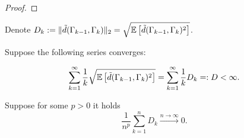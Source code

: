 \begin{lemma}
\begin{proof}
\end{proof}
\end{lemma}

Denote $D_k := \|\tilde{d}(\Gamma_{k-1}, \Gamma_k) \|_2 = \sqrt{\mathbb{E} \left[ \tilde{d}(\Gamma_{k-1}, \Gamma_k)^2 \right]}$.
\begin{assumption}
\label{a:adaptation-strong}
 Suppose the following series converges:

\[
\sum_{k=1}^{\infty} \frac{1}{k} \sqrt{\mathbb{E} \left[ \tilde{d}(\Gamma_{k-1}, \Gamma_k)^2 \right]} = \sum_{k=1}^{\infty} \frac{1}{k} D_k =: D < \infty.
\]

\end{assumption}
\begin{assumption}
\label{a:adaptation-weak}
Suppose for some $p > 0$ it holds
\[
\frac{1}{n^p} \sum_{k=1}^n D_k \xrightarrow{n \to \infty} 0.
\]

\end{assumption}


